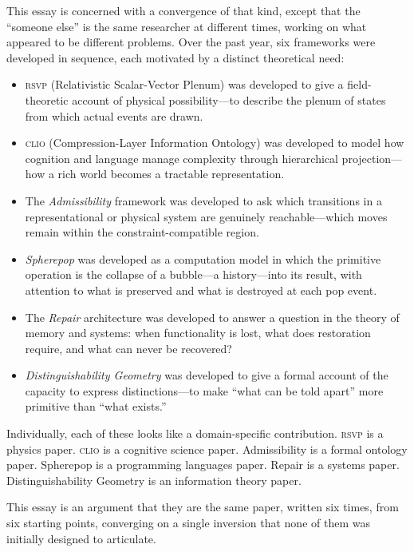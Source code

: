 \documentclass[12pt, letterpaper]{article}
\theoremstyle{remark}
\newcommand{\rsvp}{\textsc{rsvp}}
\newcommand{\clio}{\textsc{clio}}
\begin{document}
This essay is concerned with a convergence of that kind, except that the
``someone else'' is the same researcher at different times, working on what
appeared to be different problems.  Over the past year, six frameworks
were developed in sequence, each motivated by a distinct theoretical need:

\begin{itemize}
  \item \rsvp{} (Relativistic Scalar-Vector Plenum) was developed to give a
    field-theoretic account of physical possibility---to describe the plenum
    of states from which actual events are drawn.
  \item \clio{} (Compression-Layer Information Ontology) was developed to
    model how cognition and language manage complexity through hierarchical
    projection---how a rich world becomes a tractable representation.
  \item The \emph{Admissibility} framework was developed to ask which
    transitions in a representational or physical system are genuinely
    reachable---which moves remain within the constraint-compatible region.
  \item \emph{Spherepop} was developed as a computation model in which the
    primitive operation is the collapse of a bubble---a history---into its
    result, with attention to what is preserved and what is destroyed at
    each pop event.
  \item The \emph{Repair} architecture was developed to answer a question
    in the theory of memory and systems: when functionality is lost, what
    does restoration require, and what can never be recovered?
  \item \emph{Distinguishability Geometry} was developed to give a formal
    account of the capacity to express distinctions---to make ``what can be
    told apart'' more primitive than ``what exists.''
\end{itemize}

Individually, each of these looks like a domain-specific contribution.
\rsvp{} is a physics paper.  \clio{} is a cognitive science paper.
Admissibility is a formal ontology paper.  Spherepop is a programming
languages paper.  Repair is a systems paper.  Distinguishability Geometry
is an information theory paper.

This essay is an argument that they are the same paper, written six times,
from six starting points, converging on a single inversion that none of
them was initially designed to articulate.
\end{document}
